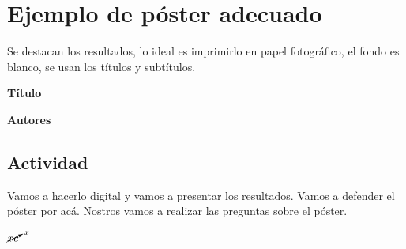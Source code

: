 \documentclass{article}
\begin{document}
 
 \section{\textcolor{Apple Green}{\textbf{Ejemplo de póster adecuado}}} \vspace{0.5cm}
 
 Se destacan los resultados, lo ideal es imprimirlo en papel fotográfico, el fondo es blanco, se usan los títulos y subtítulos. \vspace{0.5cm}
 
 \textbf{Título}
 
 \textbf{Autores}
 
 \subsection{Actividad} \vspace{0.5cm}
 
 
 Vamos a hacerlo digital y vamos a presentar los resultados. Vamos a defender el póster por acá. Nostros vamos a realizar las preguntas sobre el póster.
 




$\cancelto{x}{xc}$  
 
 
 
 
 
 
 
 
\end{document}
